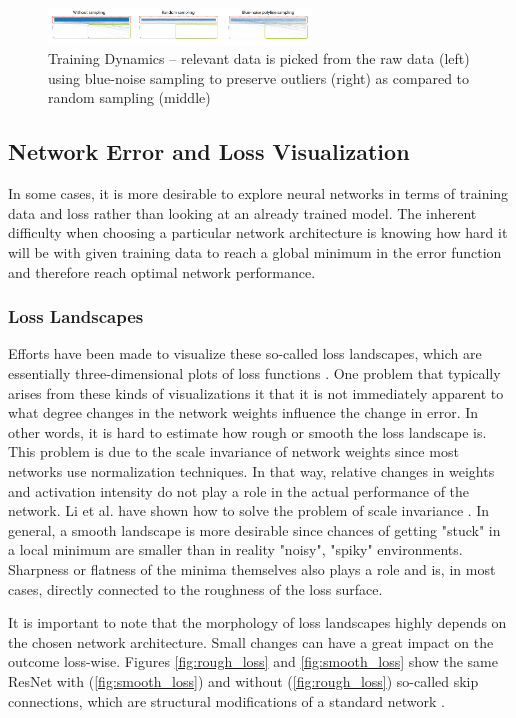 \documentclass{acmsiggraph}               %
\begin{document}
\begin{figure}[!htb]
  \centering
  \includegraphics[width=2.75in]{mengchen4}
  \caption{Training Dynamics -- relevant data is picked from the raw data (left) using blue-noise sampling to preserve outliers (right) as compared to random sampling (middle) \protect\cite{Liu2018}}
  \label{fig:mengchen4}
\end{figure}

\subsection{Network Error and Loss Visualization}
In some cases, it is more desirable to explore neural networks in terms of training data and loss rather than looking at an already trained model.
The inherent difficulty when choosing a particular network architecture is knowing how hard it will be with given training data to reach a global minimum in the error function and therefore reach optimal network performance.

\subsubsection{Loss Landscapes}
Efforts have been made to visualize these so-called loss landscapes, which are essentially three-dimensional plots of loss functions \cite{Li2017}.
One problem that typically arises from these kinds of visualizations it that it is not immediately apparent to what degree changes in the network weights influence the change in error. In other words, it is hard to estimate how rough or smooth the loss landscape is. This problem is due to the scale invariance of network weights since most networks use normalization techniques. In that way, relative changes in weights and activation intensity do not play a role in the actual performance of the network. Li et al. have shown how to solve the problem of scale invariance \cite{Li2017}. In general, a smooth landscape is more desirable since chances of getting "stuck" in a local minimum are smaller than in reality "noisy", "spiky" environments. Sharpness or flatness of the minima themselves also plays a role and is, in most cases, directly connected to the roughness of the loss surface.

It is important to note that the morphology of loss landscapes highly depends on the chosen network architecture. Small changes can have a great impact on the outcome loss-wise. Figures \ref{fig:rough_loss} and \ref{fig:smooth_loss} show the same ResNet with (\ref{fig:smooth_loss}) and without (\ref{fig:rough_loss}) so-called skip connections, which are structural modifications of a standard network \cite{He2015}.
\end{document}
